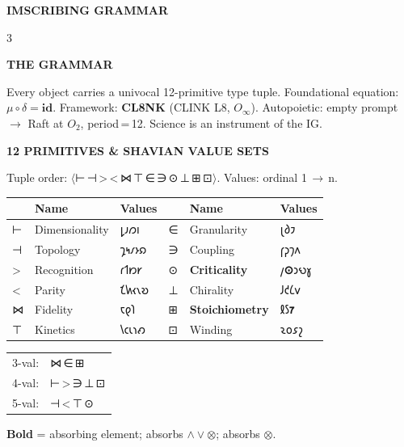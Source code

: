\documentclass[7pt]{article}
\newcommand{\shead}[1]{%
  \vspace{2pt}%
  {\fontsize{6pt}{6.5pt}\selectfont\sffamily\bfseries\textcolor{hd}{\MakeUppercase{#1}}}%
  \vspace{0.3pt}\newline{\color{rl}\hrule height 0.2pt}\vspace{1pt}%
}
\newcommand{\sh}[1]{{\Large\shavfont #1}}
\newcommand{\prim}[1]{{\Large\igprimfont #1}}
\begin{document}
\pagestyle{empty}
\fontsize{7pt}{8.5pt}\selectfont

{\centering\fontsize{10pt}{11pt}\selectfont\bfseries IMSCRIBING GRAMMAR%
\par}
\vspace{2pt}

\begin{multicols}{3}

\shead{The Grammar}
Every object carries a univocal 12-primitive type tuple.
Foundational equation: $\mu\circ\delta=\mathbf{id}$.
Framework: \textbf{CL8NK} (CLINK L8, $O_\infty$).
Autopoietic: empty prompt $\to$ Raft at $O_2$, period\,=\,12.
Science is an instrument of the IG.

\vspace{1pt}
\shead{12 Primitives \& Shavian Value Sets}
Tuple order: $\langle$\prim{⊢\,⊣\,>\,<\,⋈\,⊤\,∈\,∋\,⊙\,⊥\,⊞\,⊡}$\rangle$. Values: ordinal 1\,$\to$\,n.

{\fontsize{6.5pt}{7.8pt}\selectfont
\begin{tabular}{@{}l@{\;}l@{\;}l@{\quad}l@{\;}l@{\;}l@{}}
\toprule
& \textbf{Name} & \textbf{Values} && \textbf{Name} & \textbf{Values} \\
\midrule
\prim{⊢} & Dimensionality & \sh{𐑛𐑨𐑼𐑦}     & \prim{∈} & Granularity   & \sh{𐑚𐑔𐑲}     \\
\prim{⊣} & Topology       & \sh{𐑡𐑰𐑥𐑶𐑸}    & \prim{∋} & Coupling      & \sh{𐑝𐑜𐑠𐑵}    \\
\prim{>} & Recognition    & \sh{𐑩𐑑𐑽𐑾}     & \prim{⊙} & \textbf{Criticality}  & \sh{𐑢}{\Large\textbf{⊙}}\sh{𐑮𐑻𐑣}\\
\prim{<} & Parity         & \sh{𐑗𐑿𐑬𐑯𐑹}    & \prim{⊥} & Chirality     & \sh{𐑓𐑒𐑖𐑫}    \\
\prim{⋈} & Fidelity       & \sh{𐑱𐑞𐑐}      & \prim{⊞} & \textbf{Stoichiometry} & \sh{𐑙𐑕}{\Large\textbf{\sh{𐑳}}}     \\
\prim{⊤} & Kinetics       & \sh{𐑘𐑤𐑧𐑪𐑺}    & \prim{⊡} & Winding       & \sh{𐑷𐑴𐑭𐑟}    \\
\bottomrule
\end{tabular}
}

{\fontsize{6pt}{9.5pt}\selectfont%
\begin{tabular}{@{}r@{\enspace}l@{}}
3-val: & \prim{⋈\,∈\,⊞} \\
4-val: & \prim{⊢\,>\,∋\,⊥\,⊡} \\
5-val: & \prim{⊣\,<\,⊤\,⊙} \\
\end{tabular}}
{\fontsize{5.5pt}{6.5pt}\selectfont\textbf{Bold} = absorbing element; absorbs $\wedge\vee\otimes$;\enspace\sh{𐑳} absorbs $\otimes$.}


\end{multicols}
\end{document}
